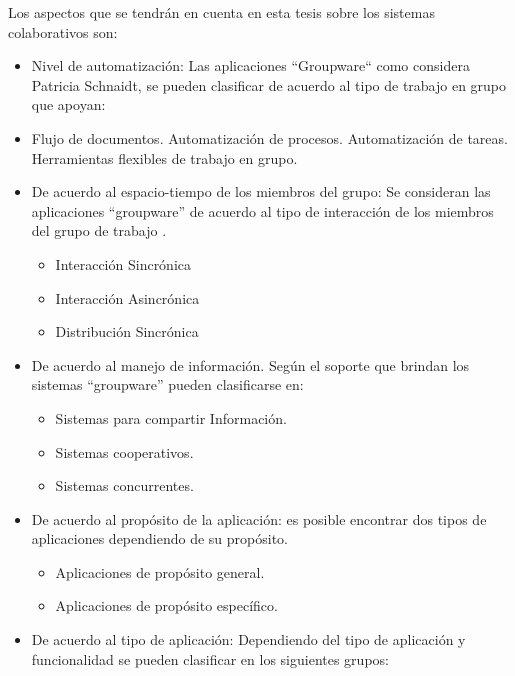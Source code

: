 Los aspectos que se tendrán en cuenta en esta tesis sobre los sistemas colaborativos son:

\begin{itemize}
 \item Nivel de automatización: Las aplicaciones ``Groupware`` como considera Patricia Schnaidt, se pueden clasificar de acuerdo al tipo de trabajo en grupo que apoyan: \cite{cap1.1.groupware}

\item Flujo de documentos. Automatización de procesos. Automatización de tareas. Herramientas flexibles de trabajo en grupo.

\end{itemize}

\begin{itemize}
\item De acuerdo al espacio-tiempo de los miembros del grupo: Se consideran las
aplicaciones “groupware” de acuerdo al tipo de interacción de los miembros del
grupo de trabajo \cite{cap1.4.groupware}.

\begin{itemize}
 \item Interacción Sincrónica
 \item Interacción Asincrónica
 \item Distribución Sincrónica
\end{itemize}

\item De acuerdo al manejo de información. Según el soporte que brindan
\cite{cap1.5.groupware} los sistemas “groupware” pueden clasificarse en:
\begin{itemize}
 \item Sistemas para compartir Información.
 \item Sistemas cooperativos.
 \item Sistemas concurrentes.
\end{itemize}

\item De acuerdo al propósito de la aplicación: es posible encontrar dos tipos de
aplicaciones dependiendo de su propósito.
\begin{itemize}
 \item Aplicaciones de propósito general.
 \item Aplicaciones de propósito específico.
\end{itemize}

\item De acuerdo al tipo de aplicación: Dependiendo del tipo de aplicación y funcionalidad se pueden clasificar en los siguientes grupos:




\end{itemize}

